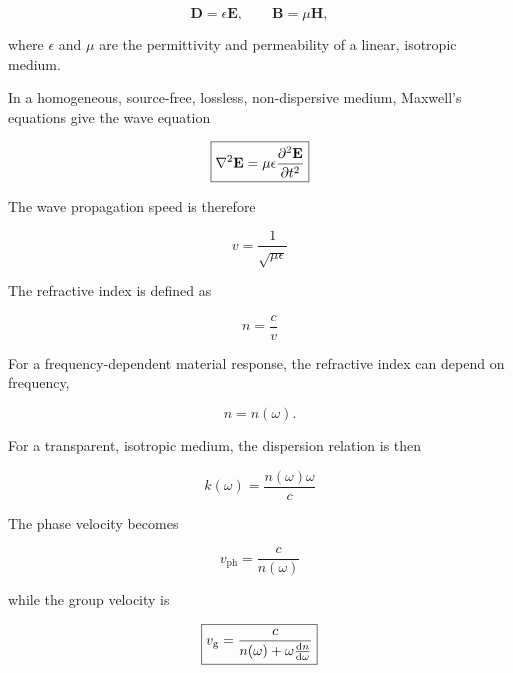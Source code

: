 \begin{equation}
\mathbf{D} = \epsilon\mathbf{E},
\qquad
\mathbf{B} = \mu\mathbf{H},
\label{eq:material_constitutive}
\end{equation}

where $\epsilon$ and $\mu$ are the permittivity
and permeability of a linear, isotropic medium.

In a homogeneous, source-free, lossless,
non-dispersive medium, Maxwell's equations
give the wave equation

\begin{equation}
\boxed{
\nabla^2\mathbf{E} =
\mu\epsilon
\pdv[2]{\mathbf{E}}{t}
}
\label{eq:em_wave_equation_medium}
\end{equation}

The wave propagation speed is therefore

\begin{equation}
\boxed{
v = \frac{1}{\sqrt{\mu\epsilon}}
}
\label{eq:em_speed_medium}
\end{equation}

The refractive index is defined as

\begin{equation}
\boxed{
n = \frac{c}{v}
}
\label{eq:refractive_index}
\end{equation}

For a frequency-dependent material response,
the refractive index can depend on frequency,

\begin{equation}
n=n(\omega).
\end{equation}

For a transparent, isotropic medium, the
dispersion relation is then

\begin{equation}
\boxed{
k(\omega) = \frac{n(\omega)\omega}{c}
}
\label{eq:material_dispersion_relation}
\end{equation}

The phase velocity becomes

\begin{equation}
\boxed{
v_{\mathrm{ph}} = \frac{c}{n(\omega)}
}
\label{eq:material_phase_velocity}
\end{equation}

while the group velocity is

\begin{equation}
\boxed{
v_{\mathrm{g}} =
\frac{c}{
n(\omega)+\omega\dv{n}{\omega}
}
}
\label{eq:material_group_velocity}
\end{equation}

